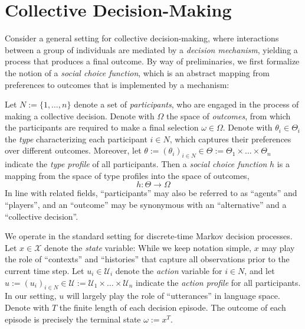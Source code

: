 \section{Collective Decision-Making}\label{sec:2}

Consider a general setting for collective decision-making,
where interactions between a group of individuals are mediated by a \textit{decision mechanism},
yielding a process that produces a final outcome.
%
By way of preliminaries,
we first formalize the notion of a \textit{social choice function},
which is an abstract mapping from preferences to outcomes that is implemented by a mechanism:

\begin{redefinition}[restate=defsocial,name=Social Choice Function]\upshape\label{def:social}
%
Let $N:=\{1,\dots,n\}$ denote a set of \textit{participants},
who are engaged in the process of making a collective decision.
%
Denote with $\Omega$ the space of \textit{outcomes},
from which the participants are required to make a final selection $\omega\in\Omega$.
%
Denote with $\theta_{i}\in\Theta_{i}$ the \textit{type} characterizing each participant $i\in N$,
which captures their preferences over different outcomes.
%
Moreover, let $\theta:=(\theta_{i})_{i\in N}\in\Theta:=\Theta_{1}\times\dots\times\Theta_{n}$ indicate the \textit{type profile} of all participants.
%
Then a \textit{social choice function} $h$ is a mapping from the space of type profiles into the space of outcomes,
%
\begin{equation}
h:\Theta\rightarrow\Omega
\end{equation}
%
In line with related fields,
``participants'' may also be referred to as ``agents'' and ``players'',
%
and an ``outcome'' may be synonymous with an ``alternative'' and a ``collective decision''.
%
\EOD
\end{redefinition}

We operate in the standard setting for discrete-time Markov decision processes.
%
Let $x\in\mathcal{X}$ denote the \textit{state} variable:
%
While we keep notation simple,
$x$ may play the role of ``contexts'' and ``histories'' that capture all observations prior to the current time step.
%
Let $u_{i}\in\mathcal{U}_{i}$ denote the \textit{action} variable for $i\in N$,
and let $u:=(u_{i})_{i\in N}\in\mathcal{U}:=\mathcal{U}_{1}\times\dots\times\mathcal{U}_{n}$ indicate the \textit{action profile} for all participants.
%
In our setting,
$u$ will largely play the role of ``utterances'' in language space.
%
Denote with $T$ the finite length of each decision episode.
%
The outcome of each episode is precisely the terminal state $\omega:=x^{T}$.

